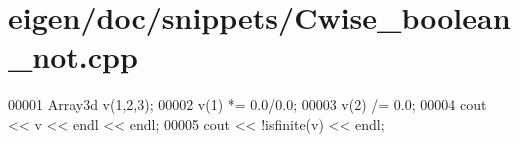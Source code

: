 \hypertarget{eigen_2doc_2snippets_2_cwise__boolean__not_8cpp_source}{}\section{eigen/doc/snippets/\+Cwise\+\_\+boolean\+\_\+not.cpp}
\label{eigen_2doc_2snippets_2_cwise__boolean__not_8cpp_source}

\begin{DoxyCode}
00001 Array3d v(1,2,3);
00002 v(1) *= 0.0/0.0;
00003 v(2) /= 0.0;
00004 cout << v << endl << endl;
00005 cout << !isfinite(v) << endl;
\end{DoxyCode}
